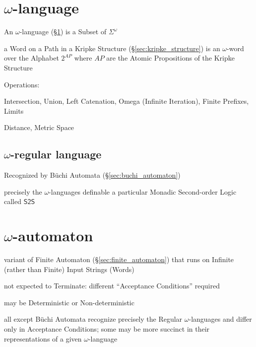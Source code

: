 \section{$\omega$-language}\label{sec:omega_language}

An $\omega$-language (\S\ref{sec:omega_language}) is a Subset of
$\Sigma^\omega$

a Word on a Path in a Kripke Structure (\S\ref{sec:kripke_structure})
is an $\omega$-word over the Alphabet $2^{AP}$ where $AP$ are the
Atomic Propositions of the Kripke Structure

Operations:

Intersection, Union, Left Catenation, Omega (Infinite Iteration),
Finite Prefixes, Limits

Distance, Metric Space %



\subsection{$\omega$-regular language}\label{sec:omega_regular}

Recognized by B\"uchi Automata (\S\ref{sec:buchi_automaton})

precisely the $\omega$-languages definable a particular Monadic
Second-order Logic called $\mathsf{S2S}$



\section{$\omega$-automaton}\label{sec:omega_automaton}

variant of Finite Automaton (\S\ref{sec:finite_automaton}) that runs
on Infinite (rather than Finite) Input Strings (Words)

not expected to Terminate: different ``Acceptance Conditions''
required %

may be Deterministic or Non-deterministic

all except B\"uchi Automata recognize precisely the Regular
$\omega$-languages and differ only in Acceptance Conditions; some may
be more succinct in their representations of a given $\omega$-language



